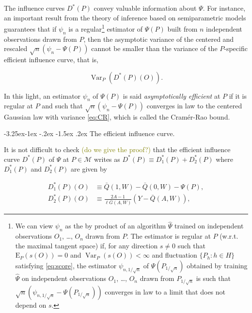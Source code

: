 \documentclass[]{article}
\makeatletter
\let\rmarkdownfootnote\footnote%
\def\footnote{\protect\rmarkdownfootnote}
\renewcommand\subsection{\@startsection{subsection}{3}{\z@}%
                                     {-3.25ex\@plus -1ex \@minus -.2ex}%
                                     {-1.5ex \@plus .2ex}%
                                     {\normalfont\normalsize\bfseries}}
\DeclareMathOperator{\Dirac}{Dirac}
\DeclareMathOperator{\Var}{Var}
\newcommand{\calM}{\mathcal{M}}
\newcommand{\Exp}{\textrm{E}}
\newcommand{\Gbar}{\bar{G}}
\newcommand{\Psihat}{\widehat{\Psi}}
\newcommand{\Qbar}{\bar{Q}}
\newcommand{\tcg}[1]{\textcolor{olive}{#1}}
\theoremstyle{definition}
\theoremstyle{definition}
\theoremstyle{definition}
\theoremstyle{remark}
\makeatother
\begin{document}
The influence curves \(D^{*}(P)\) convey valuable information about
\(\Psi\). For instance, an important result from the theory of inference
based on semiparametric models guarantees that if \(\psi_{n}\) is a
regular\footnote{We
can view  $\psi_{n}$ as the  by product of  an algorithm $\Psihat$  trained on
independent observations $O_{1}$, \ldots, $O_{n}$ drawn from $P$.  
The estimator is regular at $P$ (w.r.t. the maximal tangent space) if, for any
direction $s\neq  0$ such that  $\Exp_{P} (s(O)) =  0$ and $\Var_{P}  (s(O)) <
\infty$ and fluctuation $\{P_{h} : h \in H\}$ satisfying \eqref{eq:score}, the
estimator $\psi_{n,1/\sqrt{n}}$ of $\Psi(P_{1/\sqrt{n}})$ obtained by training
$\Psihat$  on independent  observations  $O_{1}$, \ldots,  $O_{n}$ drawn  from
$P_{1/\sqrt{n}}$    is   such    that    $\sqrt{n}   (\psi_{n,1/\sqrt{n}}    -
\Psi(P_{1/\sqrt{n}}))$ converges  in law to  a limit  that does not  depend on
$s$.} estimator of \(\Psi(P)\) built from \(n\) independent observations
drawn from \(P\), then the asymptotic variance of the centered and
rescaled \(\sqrt{n} (\psi_{n} - \Psi(P))\) cannot be smaller than the
variance of the \(P\)-specific efficient influence curve, that is,

\begin{equation}\label{eq:CR}\Var_{P}(D^{*}(P)(O)).\end{equation}

In this light, an estimator \(\psi_{n}\) of \(\Psi(P)\) is said
\textit{asymptotically efficient} at \(P\) if it is regular at \(P\) and
such that \(\sqrt{n} (\psi_{n} - \Psi(P))\) converges in law to the
centered Gaussian law with variance \eqref{eq:CR}, which is called the
Cramér-Rao bound.

\subsection{The efficient influence curve.}
\label{subsec:parameter:third}

It is not difficult to check \tcg{(do  we give the proof?)} that the
efficient influence curve \(D^{*}(P)\) of \(\Psi\) at \(P \in \calM\)
writes as \(D^{*}(P) \equiv D_{1}^{*} (P) + D_{2}^{*} (P)\) where
\(D_{1}^{*} (P)\) and \(D_{2}^{*} (P)\) are given by

\begin{align*}D_{1}^{*}(P) (O)  &\equiv \Qbar(1,W)  - \Qbar(0,W)  - \Psi(P),\\
D_{2}^{*}(P)     (O)     &\equiv      \frac{2A-1}{\ell\Gbar(A,W)}     (Y     -
\Qbar(A,W)),\end{align*}
\end{document}
